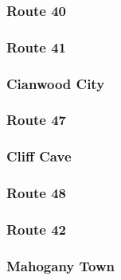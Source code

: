 \documentclass[11pt]{article}
\begin{document}
\subsubsection{Route 40}%
\label{ssubsec:Route40}%

%
%
%
%
\subsubsection{Route 41}%
\label{ssubsec:Route41}%

%
%
\subsubsection{Cianwood City}%
\label{ssubsec:CianwoodCity}%

%
%
\subsubsection{Route 47}%
\label{ssubsec:Route47}%

%
%
%
%
\subsubsection{Cliff Cave}%
\label{ssubsec:CliffCave}%

%
\subsubsection{Route 48}%
\label{ssubsec:Route48}%

%
%
%
\subsubsection{Route 42}%
\label{ssubsec:Route42}%

%
%
\subsubsection{Mahogany Town}%
\label{ssubsec:MahoganyTown}%

%
%
\end{document}
